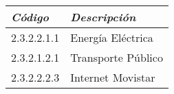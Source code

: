         \begin{table}[h!]
            \centering
            \begin{tabular}{|p{3cm}|p{5cm}|} \hline
                 
            
            \textit{{\bf{Código}}} &
            \textit{{\bf{Descripción}}}
            \\ \hline

            2.3.2.2.1.1 &
            Energía Eléctrica
            \\ \hline

            2.3.2.1.2.1 &
            Transporte Público
            \\ \hline

            2.3.2.2.2.3 &
            Internet Movistar
            \\ \hline

            \end{tabular}
        \end{table}